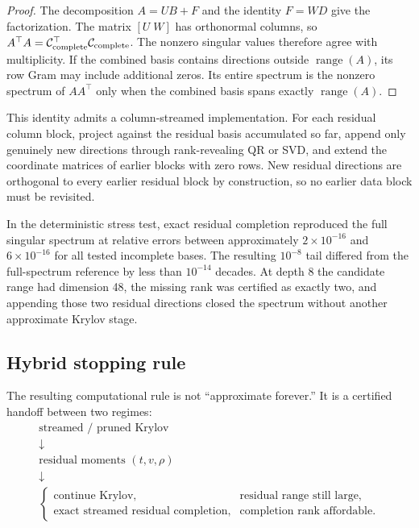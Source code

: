 \begin{proof}
The decomposition $A=UB+F$ and the identity $F=WD$ give the factorization.
The matrix $[U\;W]$ has orthonormal columns, so
$A^\top A=\mathcal C_{\rm complete}^\top\mathcal C_{\rm complete}$.
The nonzero singular values therefore agree with multiplicity. If the
combined basis contains directions outside $\operatorname{range}(A)$,
its row Gram may include additional zeros. Its entire spectrum is the
nonzero spectrum of $AA^\top$ only when the combined basis spans exactly
$\operatorname{range}(A)$.
\end{proof}

This identity admits a column-streamed implementation.  For each residual
column block, project against the residual basis accumulated so far, append
only genuinely new directions through rank-revealing QR or SVD, and extend the
coordinate matrices of earlier blocks with zero rows.  New residual directions
are orthogonal to every earlier residual block by construction, so no earlier
data block must be revisited.

In the deterministic stress test, exact residual completion reproduced the
full singular spectrum at relative errors between approximately
\(2\times10^{-16}\) and \(6\times10^{-16}\) for all tested incomplete bases.
The resulting \(10^{-8}\) tail differed from the full-spectrum reference by
less than \(10^{-14}\) decades.  At depth 8 the candidate range had dimension
48, the missing rank was certified as exactly two, and appending those two
residual directions closed the spectrum without another approximate Krylov
stage.

\subsection{Hybrid stopping rule}

The resulting computational rule is not ``approximate forever.''  It is a
certified handoff between two regimes:
\[
\boxed{
\begin{array}{c}
\text{streamed / pruned Krylov}\\[2mm]
\downarrow\\[-1mm]
\text{residual moments }(t,v,\rho)\\[2mm]
\downarrow\\[-1mm]
\begin{cases}
\text{continue Krylov}, & \text{residual range still large},\\
\text{exact streamed residual completion}, & \text{completion rank affordable}.
\end{cases}
\end{array}
}
\]

